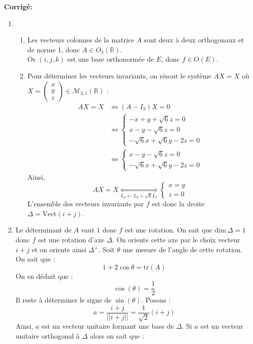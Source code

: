 \documentclass[a4paper,twoside,french,11pt]{VcCours}
\newcommand{\corr}{\textbf{Corrigé:}}
\begin{document}
\corr \begin{enumerate}
\item
\begin{enumerate}
\item
Les vecteurs colonnes de la matrice $A$ sont deux à deux orthogonaux et de norme 1, donc $A\in O_3(\mathbb{R})$.\\
Or $(i,j,k)$ est une base orthonormée de $E$, donc $f\in O(E)$.
\item
Pour déterminer les vecteurs invariants, on résout le système $AX=X$ où $X=\begin{pmatrix}
x\\y\\z
\end{pmatrix} \in \mathcal{M}_{3,1}(\mathbb{R})$ :
\begin{align*}
AX=X & \Longleftrightarrow(A-I_3)X=0 \\
&\Longleftrightarrow 
\left\lbrace
\begin{array}{l}
 -x+y+\sqrt{6}z=0\\
 x-y-\sqrt{6}z=0\\
 -\sqrt{6}x+\sqrt{6}y-2z=0
 \end{array}
 \right.\\
& \Longleftrightarrow 
\left\lbrace
\begin{array}{l}
 x-y-\sqrt{6}z=0\\
 -\sqrt{6}x+\sqrt{6}y-2z=0
 \end{array}
 \right. 
 \end{align*}
Ainsi,
$$AX=X\underset{L_2\leftarrow L_2+\sqrt{6}L_1}{\Longleftrightarrow}
 \left\lbrace
\begin{array}{l}
x=y\\
z=0
 \end{array}
 \right. $$
L'ensemble des vecteurs invariants par $f$ est donc la droite $\Delta=\mathrm{Vect}(i+j)$.
\end{enumerate}
\item Le déterminant de $A$ vaut $1$ donc $f$ est une rotation. On sait que $\mathrm{dim}\,\Delta=1$ donc $f$ est une rotation d'axe $\Delta$. On oriente cette axe par le choix vecteur $i+j$ et on oriente ainsi $\Delta^{\perp}$. Soit $\theta$ une mesure de l'angle de cette rotation. On sait que :
$$ 1+2\cos\theta=\mathrm{tr}(A)$$
On en déduit que :
$$\cos(\theta)=\frac{1}{2}$$
Il reste à déterminer le signe de $\sin (\theta)$.
Posons :
$$a =\dfrac{i+j}{||i+j||}=\frac{1}{\sqrt{2}}(i+j)$$
Ainsi, $a$ est un vecteur unitaire formant une base de $\Delta$. Si $u$ est un vecteur unitaire orthogonal à $\Delta$ alors on sait que :

\end{enumerate}
\end{document}
